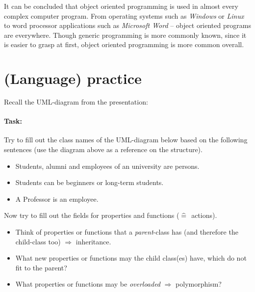 It can be concluded that object oriented programming is used in almost every complex computer program. From operating systems such as \emph{Windows} or \emph{Linux} to word processor applications such as \emph{Microsoft Word} -- object oriented programs are everywhere. Though generic programming is more commonly known, since it is easier to grasp at first, object oriented programming is more common overall.

\section*{(Language) practice}
Recall the UML-diagram from the presentation:
\begin{center}
\end{center}
\paragraph{Task:} 
\begin{anumerate}
\item Try to fill out the class names of the UML-diagram below based on the following sentences (use the diagram above as a reference on the structure).
\begin{itemize}
\item Students, alumni and employees of an university are persons.
\item Students can be beginners or long-term students.
\item A Professor is an employee.
\end{itemize}
\newpage
\item Now try to fill out the fields for properties and functions ($\;\widehat{=}\;$ actions).
\begin{itemize}
\item Think of properties or functions that a \emph{parent}-class has (and therefore the child-class too) $\Rightarrow$ inheritance. 
\item What new properties or functions may the child class(es) have, which do not fit to the parent?
\item What properties or functions may be \emph{overloaded} $\Rightarrow$ polymorphism?
\end{itemize}
\end{anumerate}

